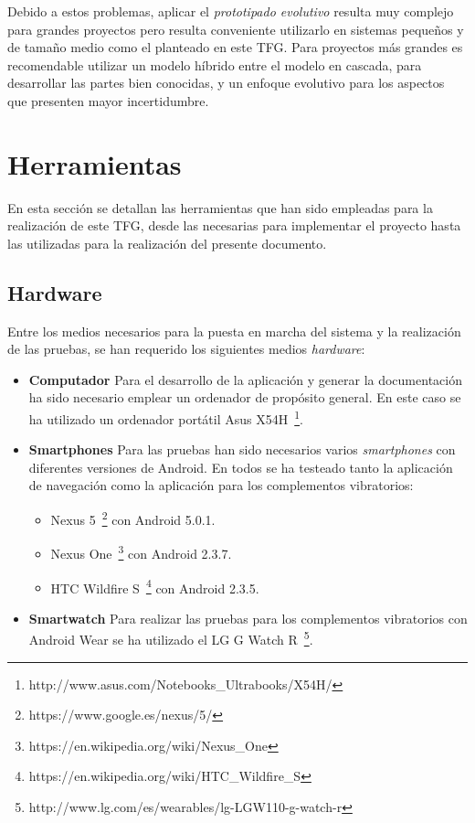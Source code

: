 Debido a estos problemas, aplicar el \emph{prototipado evolutivo} resulta muy complejo para grandes
proyectos pero resulta conveniente utilizarlo en sistemas pequeños y de tamaño medio como el
planteado en este \acs{TFG}. Para proyectos más grandes es recomendable utilizar un modelo híbrido
entre el modelo en cascada, para desarrollar las partes bien conocidas, y un enfoque evolutivo para
los aspectos que presenten mayor incertidumbre.

\section{Herramientas}

En esta sección se detallan las herramientas que han sido empleadas para la realización de este
\acs{TFG}, desde las necesarias para implementar el proyecto hasta las utilizadas para la
realización del presente documento.

\subsection{Hardware}
\label{sec:herramientasHardware}

Entre los medios necesarios para la puesta en marcha del sistema y la realización de las pruebas, se
han requerido los siguientes medios \emph{hardware}:

\begin{itemize}
  \item \textbf{Computador} Para el desarrollo de la aplicación y generar la documentación ha sido
    necesario emplear un ordenador de propósito general. En este caso se ha utilizado un ordenador
    portátil Asus X54H~\footnote{http://www.asus.com/Notebooks\_Ultrabooks/X54H/}.

  \item \textbf{Smartphones} Para las pruebas han sido necesarios varios \emph{smartphones} con
    diferentes versiones de Android. En todos se ha testeado tanto la aplicación de navegación como
    la aplicación para los complementos vibratorios:
    \begin{itemize}
      \item Nexus 5~\footnote{https://www.google.es/nexus/5/} con Android 5.0.1.
      \item Nexus One~\footnote{https://en.wikipedia.org/wiki/Nexus\_One} con Android 2.3.7.
      \item HTC Wildfire S~\footnote{https://en.wikipedia.org/wiki/HTC\_Wildfire\_S} con Android
        2.3.5.
    \end{itemize}

  \item \textbf{Smartwatch} Para realizar las pruebas para los complementos vibratorios con Android
    Wear se ha utilizado el LG G Watch
    R~\footnote{http://www.lg.com/es/wearables/lg-LGW110-g-watch-r}.

\end{itemize}

